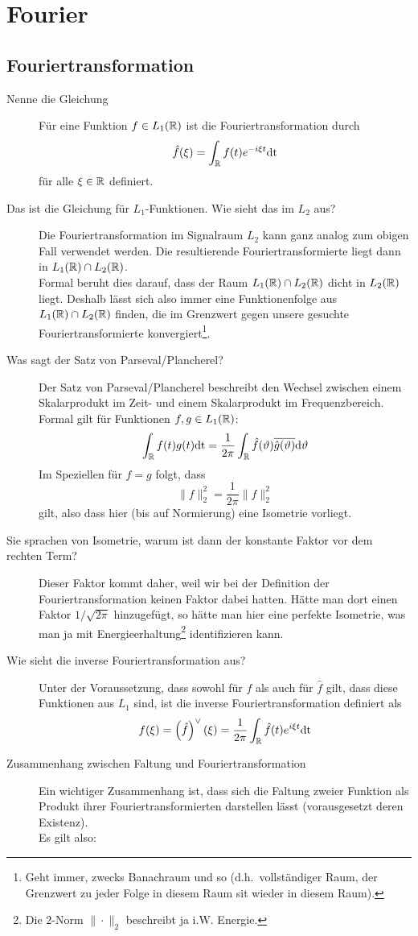 \section{Fourier}
\subsection{Fouriertransformation}
\begin{description}
	\item[Nenne die Gleichung]
      Für eine Funktion $f \in L_1(\mathbb{R})$ ist die Fouriertransformation durch
      $$ \hat f(\xi) = \int_{\mathbb{R}} f(t) e^{-i\xi t}\text{dt} $$
      für alle $\xi \in \mathbb{R}$ definiert.
    \item[Das ist die Gleichung für $L_1$-Funktionen. Wie sieht das im $L_2$ aus?]
      Die Fouriertransformation im Signalraum $L_2$ kann ganz analog zum obigen Fall verwendet werden.
      Die resultierende Fouriertransformierte liegt dann in $L_1(\mathbb{R}) \cap L_2(\mathbb{R})$.\\
      Formal beruht dies darauf, dass der Raum $L_1(\mathbb{R})\cap L_2(\mathbb{R})$ dicht in $L_2(\mathbb{R})$ liegt. Deshalb
      lässt sich also immer eine Funktionenfolge aus $L_1(\mathbb{R})\cap L_2(\mathbb{R})$ finden, die im Grenzwert
      gegen unsere gesuchte Fouriertransformierte konvergiert\footnote{Geht immer, zwecks 
      Banachraum und so (d.h.\ vollständiger Raum, der Grenzwert zu jeder Folge in diesem Raum sit 
      wieder in diesem Raum).}.
  \item[Was sagt der Satz von Parseval/Plancherel?]
    Der Satz von Parseval/Plancherel beschreibt den Wechsel zwischen einem 
    Skalarprodukt im Zeit- und einem Skalarprodukt im Frequenzbereich.\\
    Formal gilt für Funktionen $f, g \in L_1(\mathbb{R})$:
    $$ \int_{\mathbb{R}} f(t)g(t)\text{dt} = \frac{1}{2\pi}\int_{\mathbb{R}}\hat f(\vartheta)\overline{\hat 
    g(\vartheta)}\text{d} \vartheta $$
    Im Speziellen für $f=g$ folgt, dass
    $$ \|f\|_2^2 = \frac{1}{2\pi}\|\hat f\|_2^2 $$
    gilt, also dass hier (bis auf Normierung) eine Isometrie vorliegt.
  \item[Sie sprachen von Isometrie, warum ist dann der konstante Faktor vor dem rechten Term?]
    Dieser Faktor kommt daher, weil wir bei der Definition der Fouriertransformation keinen Faktor
    dabei hatten. Hätte man dort einen Faktor $1/\sqrt{2\pi}$ hinzugefügt, so hätte man hier eine
    perfekte Isometrie, was man ja mit Energieerhaltung\footnote{Die $2$-Norm $\|\cdot\|_2$ 
    beschreibt ja i.W. Energie.} identifizieren kann.
\item[Wie sieht die inverse Fouriertransformation aus?]
    Unter der Voraussetzung, dass sowohl für $f$ als auch für $\hat f$ gilt, dass
    diese Funktionen aus $L_1$ sind, ist die inverse Fouriertransformation 
    definiert als
    $$ f(\xi) = \left(\hat f\right)^{\lor{}}(\xi) = \frac{1}{2\pi}\int_{\mathbb{R}} \hat f(t)e^{i\xi 
    t}\text{dt} $$      
\item[Zusammenhang zwischen Faltung und Fouriertransformation]
    Ein wichtiger Zusammenhang ist, dass sich die Faltung zweier Funktion als Produkt ihrer 
    Fouriertransformierten darstellen lässt (vorausgesetzt deren Existenz).\\
    Es gilt also:
    

\end{description}
